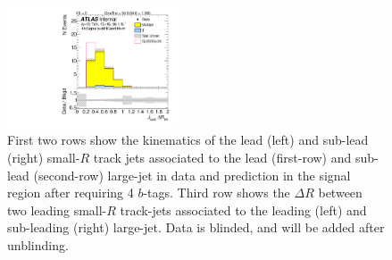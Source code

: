 \begin{figure}[htbp!]
\begin{center}
\includegraphics[width=0.45\textwidth,angle=-90]{figures/boosted/Signal/b77_FourTag_Signal_sublHCand_trk_dr_blind.pdf}
  \caption{First two rows show the kinematics of the lead (left) and sub-lead (right) small-$R$ track jets associated to the lead (first-row) and sub-lead (second-row) large-\R jet in data and prediction in the signal region after requiring 4 $b$-tags. Third row shows the $\Delta R$ between two leading small-$R$ track-jets associated to the leading (left) and sub-leading (right) large-\R jet. Data is blinded, and will be added after unblinding. }
  \label{fig:boosted-4b-signal-blind-ak2}
\end{center}
\end{figure}


